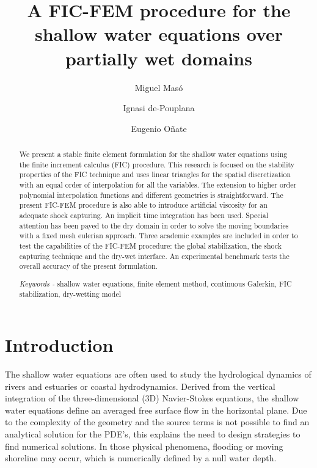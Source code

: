 \documentclass[a4paper,12pt]{article}
\title{A FIC-FEM procedure for the shallow water equations over partially wet domains}
\author[1,2]{Miguel Masó}
\author[1,2]{Ignasi de-Pouplana}
\author[1,2]{Eugenio Oñate}
\affil[1]{Centre Int. de Mètodes Numèrics a l'Enginyeria (CIMNE), Barcelona, Spain}
\affil[2]{Universitat Politècnica de Catalunya (UPC), Barcelona, Spain}
\newcommand{\keywords}[1]{\textit{Keywords -} #1}
\begin{document}

\maketitle

\begin{abstract}
\noindent
We present a stable finite element formulation for the shallow water equations using the finite increment calculus (FIC) procedure.
This research is focused on the stability properties of the FIC technique and uses linear triangles for the spatial discretization with an equal order of interpolation for all the variables.
The extension to higher order polynomial interpolation functions and different geometries is straightforward.
The present FIC-FEM procedure is also able to introduce artificial viscosity for an adequate shock capturing.
An implicit time integration has been used. Special attention has been payed to the dry domain in order to solve the moving boundaries with a fixed mesh eulerian approach.
Three academic examples are included in order to test the capabilities of the FIC-FEM procedure: the global stabilization, the shock capturing technique and the dry-wet interface.
An experimental benchmark tests the overall accuracy of the present formulation.
\vspace{1em}

\noindent
\keywords{shallow water equations, finite element method, continuous Galerkin, FIC stabilization, dry-wetting model}
\end{abstract}


\section{Introduction}


The shallow water equations are often used to study the hydrological dynamics of rivers and estuaries or coastal hydrodynamics.
Derived from the vertical integration of the three-dimensional (3D) Navier-Stokes equations, the shallow water equations define an averaged free surface flow in the horizontal plane.
Due to the complexity of the geometry and the source terms is not possible to find an analytical solution for the PDE's, this explains the need to design strategies to find numerical solutions.
In those physical phenomena, flooding or moving shoreline may occur, which is numerically defined by a null water depth.
\end{document}
